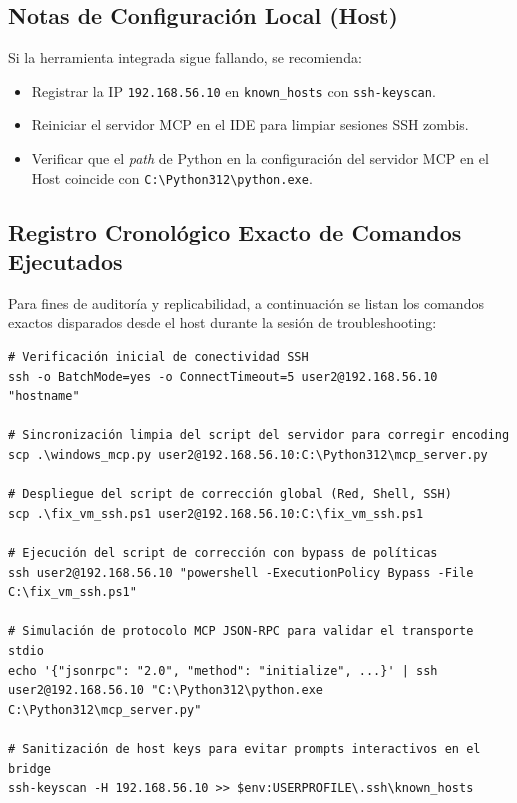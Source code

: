 \subsection*{Notas de Configuración Local (Host)}
Si la herramienta integrada sigue fallando, se recomienda:
\begin{itemize}
    \item Registrar la IP \texttt{192.168.56.10} en \texttt{known\_}\allowbreak\texttt{hosts} con \texttt{ssh-}\allowbreak\texttt{keyscan}.
    \item Reiniciar el servidor MCP en el IDE para limpiar sesiones SSH zombis.
    \item Verificar que el \textit{path} de Python en la configuración del servidor MCP en el Host coincide con \texttt{C:\textbackslash}\allowbreak\texttt{Python312\textbackslash}\allowbreak\texttt{python.exe}.
\end{itemize}


\subsection*{Registro Cronológico Exacto de Comandos Ejecutados}
Para fines de auditoría y replicabilidad, a continuación se listan los comandos exactos disparados desde el host durante la sesión de troubleshooting:

\begin{lstlisting}
# Verificación inicial de conectividad SSH
ssh -o BatchMode=yes -o ConnectTimeout=5 user2@192.168.56.10 "hostname"

# Sincronización limpia del script del servidor para corregir encoding
scp .\windows_mcp.py user2@192.168.56.10:C:\Python312\mcp_server.py

# Despliegue del script de corrección global (Red, Shell, SSH)
scp .\fix_vm_ssh.ps1 user2@192.168.56.10:C:\fix_vm_ssh.ps1

# Ejecución del script de corrección con bypass de políticas
ssh user2@192.168.56.10 "powershell -ExecutionPolicy Bypass -File C:\fix_vm_ssh.ps1"

# Simulación de protocolo MCP JSON-RPC para validar el transporte stdio
echo '{"jsonrpc": "2.0", "method": "initialize", ...}' | ssh user2@192.168.56.10 "C:\Python312\python.exe C:\Python312\mcp_server.py"

# Sanitización de host keys para evitar prompts interactivos en el bridge
ssh-keyscan -H 192.168.56.10 >> $env:USERPROFILE\.ssh\known_hosts
\end{lstlisting}

